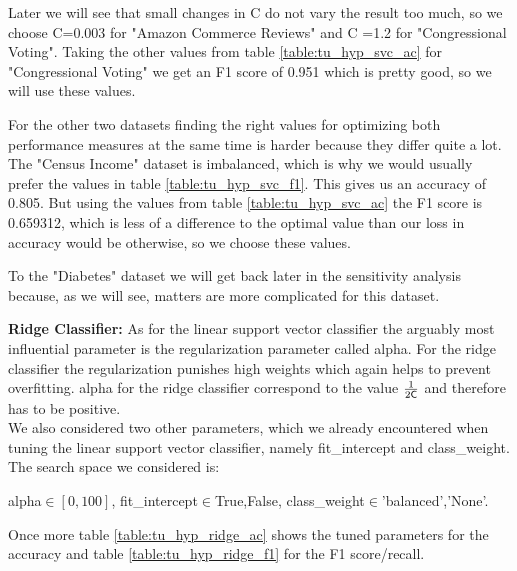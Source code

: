 \documentclass[a4paper,10pt]{article}
\begin{document}
Later we will see that small changes in \textsf{C} do not vary the result too much, so we choose \textsf{C}=0.003 for "Amazon Commerce Reviews" and \textsf{C} =1.2 for "Congressional Voting". Taking the other values from table \ref{table:tu_hyp_svc_ac} for "Congressional Voting" we get an F1 score of 0.951 which is pretty good, so we will use these values.

For the other two datasets finding the right values for optimizing both performance measures at the same time is harder because they differ quite a lot. The "Census Income" dataset is imbalanced, which is why we would usually prefer the values in table \ref{table:tu_hyp_svc_f1}. This gives us an accuracy of 0.805. But using the values from table \ref{table:tu_hyp_svc_ac} the F1 score is 0.659312, which is less of a difference to the optimal value than our loss in accuracy would be otherwise, so we choose these values.

To the "Diabetes" dataset we will get back later in the sensitivity analysis because, as we will see, matters are more complicated for this dataset.

\textbf{Ridge Classifier:}
As for the linear support vector classifier the arguably most influential parameter is the regularization parameter called \textsf{alpha}. For the ridge classifier the regularization punishes high weights which again helps to prevent overfitting. \textsf{alpha} for the ridge classifier correspond to the value \(\frac{1}{2 \text{\textsf{C}}}\) and therefore has to be positive.\\
We also considered two other parameters, which we already encountered when tuning the linear support vector classifier, namely \textsf{fit\_intercept} and \textsf{class\_weight}. The search space we considered is:
\begin{center}
    \textsf{alpha}\(\in[0,100]\), \textsf{fit\_intercept}\(\in\){True,False}, \textsf{class\_weight}\(\in\){'balanced','None'}.
\end{center}

Once more table \ref{table:tu_hyp_ridge_ac} shows the tuned parameters for the accuracy and table \ref{table:tu_hyp_ridge_f1} for the F1 score/recall.
\end{document}
